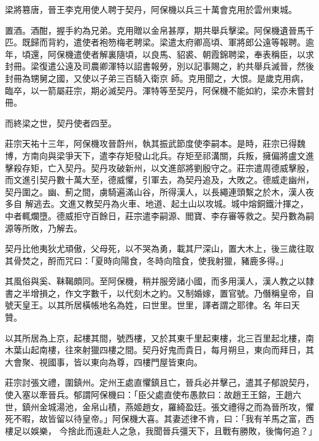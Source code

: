 \begin{pinyinscope}
 梁將篡唐，晉王李克用使人聘于契丹，阿保機以兵三十萬會克用於雲州東城。



 置酒。酒酣，握手約為兄弟。克用贈以金帛甚厚，期共舉兵擊梁。阿保機遺晉馬千匹。既歸而背約，遣使者袍笏梅老聘梁。梁遣太府卿高頃、軍將郎公遠等報聘。逾年，頃還，阿保機遣使者解裏隨頃，以良馬、貂裘、朝霞錦聘梁，奉表稱臣，以求封冊。梁復遣公遠及司農卿渾特以詔書報勞，別以記事賜之，約共舉兵滅晉，然後封冊為甥舅之國，又使以子弟三百騎入衛京
 師。克用聞之，大恨。是歲克用病，臨卒，以一箭屬莊宗，期必滅契丹。渾特等至契丹，阿保機不能如約，梁亦未嘗封冊。



 而終梁之世，契丹使者四至。



 莊宗天祐十三年，阿保機攻晉蔚州，執其振武節度使李嗣本。是時，莊宗已得魏博，方南向與梁爭天下，遣李存矩發山北兵。存矩至祁溝關，兵叛，擁偏將盧文進擊殺存矩，亡入契丹。契丹攻破新州，以文進部將劉殷守之。莊宗遣周德威擊殷，而文進引契丹數十萬大至，德威懼，引軍去，為契丹追及，大敗之。德威走幽州，契丹圍之。幽、薊之間，虜騎遍滿山谷，所得漢人，以長繩連頭繫之於木，漢人夜多自
 解逃去。文進又教契丹為火車、地道、起土山以攻城。城中熔銅鐵汁揮之，中者輒爛墮。德威拒守百餘日，莊宗遣李嗣源、閻寶、李存審等救之。契丹數為嗣源等所敗，乃解去。



 契丹比他夷狄尤頑傲，父母死，以不哭為勇，載其尸深山，置大木上，後三歲往取其骨焚之，酹而咒曰：「夏時向陽食，冬時向陰食，使我射獵，豬鹿多得。」



 其風俗與奚、靺鞨頗同。至阿保機，稍并服旁諸小國，而多用漢人，漢人教之以隸書之半增損之，作文字數千，以代刻木之約。又制婚嫁，置官號。乃僭稱皇帝，自號天皇王。以其所居橫帳地名為姓，曰世里。世里，譯者謂之耶律。名
 年曰天贊。



 以其所居為上京，起樓其間，號西樓，又於其東千里起東樓，北三百里起北樓，南木葉山起南樓，往來射獵四樓之間。契丹好鬼而貴日，每月朔旦，東向而拜日，其大會聚、視國事，皆以東向為尊，四樓門屋皆東向。



 莊宗討張文禮，圍鎮州。定州王處直懼鎮且亡，晉兵必并擊己，遣其子郁說契丹，使入塞以牽晉兵。郁謂阿保機曰：「臣父處直使布愚款曰：故趙王王鎔，王趙六世，鎮州金城湯池，金帛山積，燕姬趙女，羅綺盈廷。張文禮得之而為晉所攻，懼死不暇，故皆留以待皇帝。」阿保機大喜。其妻述律不肯，曰：「我有羊馬之富，西樓足以娛樂，
 今捨此而遠赴人之急，我聞晉兵彊天下，且戰有勝敗，後悔何追？」




\end{pinyinscope}
